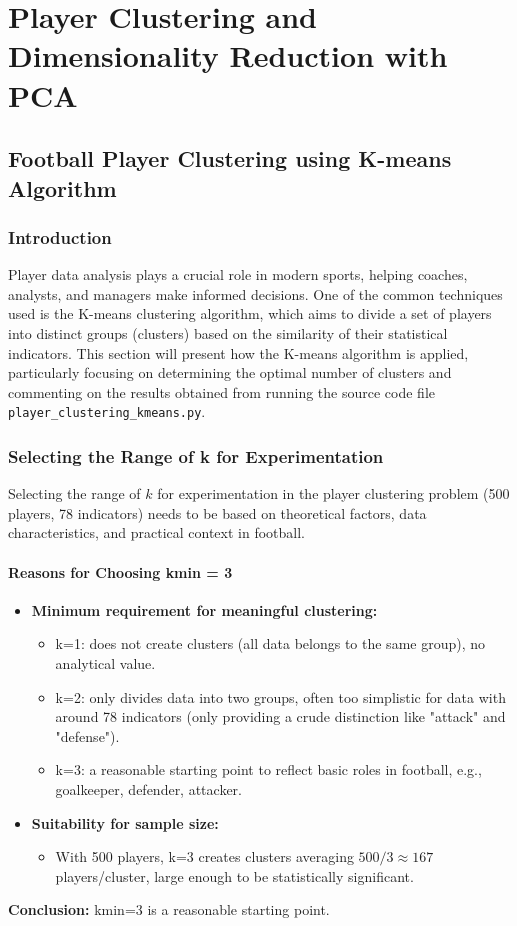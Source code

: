 \documentclass[12pt, a4paper]{report}
\begin{document}
\chapter{Player Clustering and Dimensionality Reduction with PCA}

\section{Football Player Clustering using K-means Algorithm}

\subsection{Introduction}
Player data analysis plays a crucial role in modern sports, helping coaches, analysts, and managers make informed decisions.
One of the common techniques used is the K-means clustering algorithm, which aims to divide a set of players into distinct groups (clusters) based on the similarity of their statistical indicators.
This section will present how the K-means algorithm is applied, particularly focusing on determining the optimal number of clusters and commenting on the results obtained from running the source code file \texttt{player\_clustering\_kmeans.py}.

\subsection{Selecting the Range of k for Experimentation}
Selecting the range of $k$ for experimentation in the player clustering problem (500 players, 78 indicators) needs to be based on theoretical factors, data characteristics, and practical context in football.

\subsubsection*{Reasons for Choosing kmin = 3}
\begin{itemize}
    \item \textbf{Minimum requirement for meaningful clustering:}
    \begin{itemize}
        \item k=1: does not create clusters (all data belongs to the same group), no analytical value.
        \item k=2: only divides data into two groups, often too simplistic for data with around 78 indicators (only providing a crude distinction like "attack" and "defense").
        \item k=3: a reasonable starting point to reflect basic roles in football, e.g., goalkeeper, defender, attacker.
    \end{itemize}
    \item \textbf{Suitability for sample size:}
    \begin{itemize}
        \item With 500 players, k=3 creates clusters averaging $500/3 \approx 167$ players/cluster, large enough to be statistically significant.
    \end{itemize}
\end{itemize}
\textbf{Conclusion:} kmin=3 is a reasonable starting point.
\end{document}
